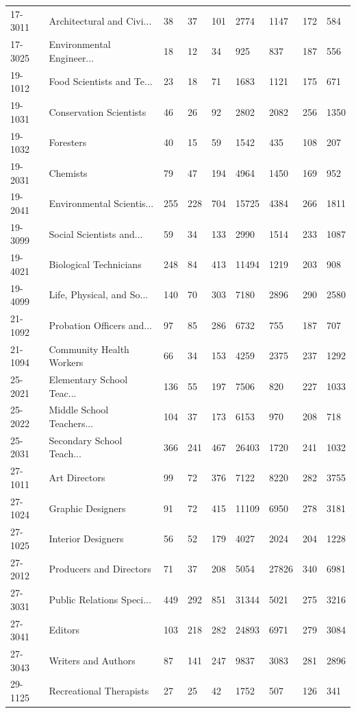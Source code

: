 \begin{longtable}{p{0.9cm}p{3.4cm}p{1.0cm}p{1.05cm}p{1.1cm}p{1.05cm}p{1.0cm}p{1.0cm}p{1.1cm}}
17-3011 & Architectural and Civi... & 38 & 37 & 101 & 2774 & 1147 & 172 & 584 \\
17-3025 & Environmental Engineer... & 18 & 12 & 34 & 925 & 837 & 187 & 556 \\
19-1012 & Food Scientists and Te... & 23 & 18 & 71 & 1683 & 1121 & 175 & 671 \\
19-1031 & Conservation Scientists & 46 & 26 & 92 & 2802 & 2082 & 256 & 1350 \\
19-1032 & Foresters & 40 & 15 & 59 & 1542 & 435 & 108 & 207 \\
19-2031 & Chemists & 79 & 47 & 194 & 4964 & 1450 & 169 & 952 \\
19-2041 & Environmental Scientis... & 255 & 228 & 704 & 15725 & 4384 & 266 & 1811 \\
19-3099 & Social Scientists and... & 59 & 34 & 133 & 2990 & 1514 & 233 & 1087 \\
19-4021 & Biological Technicians & 248 & 84 & 413 & 11494 & 1219 & 203 & 908 \\
19-4099 & Life, Physical, and So... & 140 & 70 & 303 & 7180 & 2896 & 290 & 2580 \\
21-1092 & Probation Officers and... & 97 & 85 & 286 & 6732 & 755 & 187 & 707 \\
21-1094 & Community Health Workers & 66 & 34 & 153 & 4259 & 2375 & 237 & 1292 \\
25-2021 & Elementary School Teac... & 136 & 55 & 197 & 7506 & 820 & 227 & 1033 \\
25-2022 & Middle School Teachers... & 104 & 37 & 173 & 6153 & 970 & 208 & 718 \\
25-2031 & Secondary School Teach... & 366 & 241 & 467 & 26403 & 1720 & 241 & 1032 \\
27-1011 & Art Directors & 99 & 72 & 376 & 7122 & 8220 & 282 & 3755 \\
27-1024 & Graphic Designers & 91 & 72 & 415 & 11109 & 6950 & 278 & 3181 \\
27-1025 & Interior Designers & 56 & 52 & 179 & 4027 & 2024 & 204 & 1228 \\
27-2012 & Producers and Directors & 71 & 37 & 208 & 5054 & 27826 & 340 & 6981 \\
27-3031 & Public Relations Speci... & 449 & 292 & 851 & 31344 & 5021 & 275 & 3216 \\
27-3041 & Editors & 103 & 218 & 282 & 24893 & 6971 & 279 & 3084 \\
27-3043 & Writers and Authors & 87 & 141 & 247 & 9837 & 3083 & 281 & 2896 \\
29-1125 & Recreational Therapists & 27 & 25 & 42 & 1752 & 507 & 126 & 341 \\

\end{longtable}
